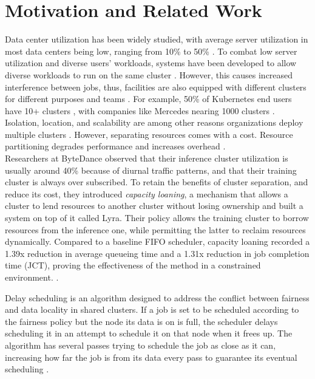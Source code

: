 \section{Motivation and Related Work}
Data center utilization has been widely studied, with average server utilization in most data centers being low, 
ranging from 10\% to 50\%
\cite{lo_heracles_2015}. 
To combat low server utilization and diverse users' workloads, systems have been developed to allow diverse workloads to run 
on the same cluster \cite{bhattacharya_hierarchical_2013, hindman_mesos_nodate}. 
However, this causes increased interference between jobs, thus, 
facilities are also equipped with different clusters for different purposes and teams \cite{patel_what_2022, li_lyra_2023}. 
For example, 50\% of Kubernetes \cite{borg}
end users have 10+ clusters \cite{noauthor_cncf_2023} 
, with companies like Mercedes nearing 1000 clusters \cite{noauthor_mercedes-benz_2023}.
Isolation, location, and scalability are among other reasons organizations deploy multiple clusters \cite{google-cloud-blog}.
However, separating resources comes with a cost. Resource partitioning degrades performance and increases overhead \cite{adv-dis-mutli}.\\ 
Researchers at ByteDance observed that their inference cluster utilization is usually around 40\% because 
of diurnal traffic patterns, and that their training cluster is always over subscribed. 
To retain the benefits of cluster separation, and reduce its cost, they introduced \textit{capacity loaning}, 
a mechanism that allows a cluster to lend resources to another cluster without losing ownership and built a system on top 
of it called Lyra.
Their policy allows the training cluster to borrow resources from the inference one, while permitting the 
latter to reclaim resources dynamically. 
Compared to a baseline FIFO scheduler, capacity loaning recorded a 1.39x reduction in average queueing time and a 1.31x 
reduction in job completion time (JCT), proving the effectiveness of the method in a constrained environment. \cite{li_lyra_2023}.

Delay scheduling is an algorithm designed to address the conflict between fairness and data locality in 
shared clusters. 
If a job is set to be scheduled according to the fairness policy but the node its data is on is full, 
the scheduler delays scheduling it in an attempt to schedule it on that node when it frees up. The algorithm 
has several passes trying to schedule the job as close as it can, increasing how far the job is from its data every pass 
to guarantee its eventual scheduling \cite{zaharia_delay_2010}.


